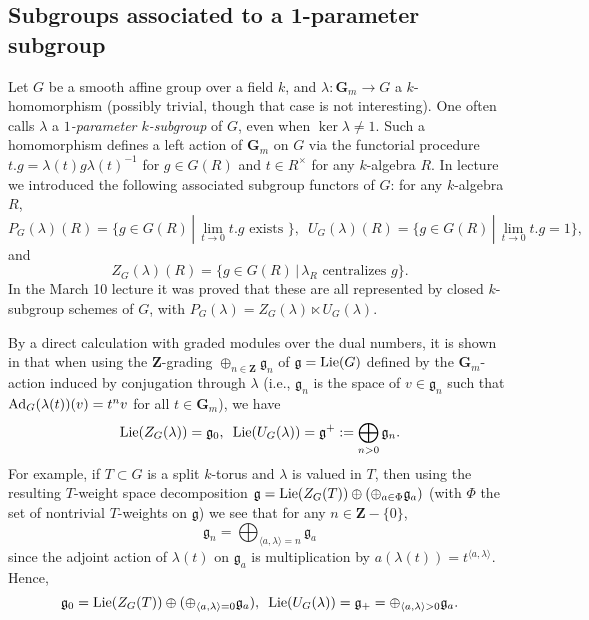 \documentclass[10pt]{article}
\newcommand{\ZZ}{\mathbf{Z}}
\renewcommand{\(}{\left(}
\renewcommand{\)}{\right)}
\numberwithin{thm}{subsection}
\begin{document}
\subsection{Subgroups associated to a 1-parameter subgroup}\label{sub1}

Let $G$ be a smooth affine group over a field $k$, and $\lambda:\mathbf{G}_m
\rightarrow G$ a $k$-homomorphism (possibly trivial, though that case is not
interesting). One often calls $\lambda$ a {\em $1$-parameter $k$-subgroup} of $G$,
even when $\ker \lambda \ne 1$.  Such a homomorphism 
defines a left action of $\mathbf{G}_m$ on $G$ via
the functorial procedure $t.g = \lambda(t)g\lambda(t)^{-1}$ for
$g \in G(R)$ and $t \in R^{\times}$ for any $k$-algebra $R$. In lecture we introduced the following 
associated subgroup functors of $G$:  for any $k$-algebra $R$,
$$P_G(\lambda)(R) = \{g \in G(R)\,|\,\lim_{t \rightarrow 0} t.g \mbox{ exists }\},\,\,\,
U_G(\lambda)(R) = \{g \in G(R)\,|\,\lim_{t \rightarrow 0} t.g = 1\},$$
and 
$$Z_G(\lambda)(R) = \{g \in G(R)\,|\,\lambda_R \mbox{ centralizes } g\}.$$
In the March 10 lecture  it was proved that these are all represented by closed $k$-subgroup schemes of $G$,
with $P_G(\lambda) = Z_G(\lambda) \ltimes U_G(\lambda)$.  

By a direct calculation with graded modules over the dual numbers, it is shown in \cite[Prop.\,2.1.8(1)]{pred}
that when using the $\ZZ$-grading $\oplus_{n \in \ZZ} \mathfrak{g}_n$ of $\mathfrak{g} = {\rm{Lie}}(G)$
defined by the $\mathbf{G}_m$-action induced by conjugation through $\lambda$ (i.e., $\mathfrak{g}_n$ is
the space of $v \in \mathfrak{g}_n$ such that ${\rm{Ad}}_G(\lambda(t))(v) = t^n v$ for all $t \in \mathbf{G}_m$), we have
$${\rm{Lie}}(Z_G(\lambda)) = \mathfrak{g}_0,\,\,\,
{\rm{Lie}}(U_G(\lambda)) = \mathfrak{g}^+ := \bigoplus_{n > 0} \mathfrak{g}_n.$$
For example, if $T \subset G$ is a split $k$-torus and $\lambda$ is valued in $T$, then using the resulting
$T$-weight space decomposition $\mathfrak{g} = {\rm{Lie}}(Z_G(T)) \oplus (\oplus_{a \in \Phi} \mathfrak{g}_a)$
(with $\Phi$ the set of nontrivial $T$-weights on $\mathfrak{g}$) we see that for any
$n \in \ZZ - \{0\}$,
$$\mathfrak{g}_n = \bigoplus_{\langle a, \lambda \rangle = n} \mathfrak{g}_a$$
since the adjoint action of $\lambda(t)$ on $\mathfrak{g}_a$ is multiplication by
$a(\lambda(t)) = t^{\langle a, \lambda \rangle}$.  Hence, 
$$\mathfrak{g}_0 = {\rm{Lie}}(Z_G(T)) \oplus (\oplus_{\langle a, \lambda \rangle = 0} \mathfrak{g}_a),\,\,\,
{\rm{Lie}}(U_G(\lambda)) = \mathfrak{g}_+ = \oplus_{\langle a, \lambda \rangle > 0} \mathfrak{g}_a.$$
\end{document}
